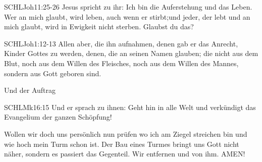 \documentclass[14pt]{../../inc/mybib}
\begin{document}
    \begin{bibelbox}{SCHL}{Joh}{11:25-26}
        Jesus spricht zu ihr: Ich bin die Auferstehung und das Leben. Wer an mich glaubt, wird leben, auch wenn er stirbt;und jeder, der lebt und an mich glaubt, wird in Ewigkeit nicht sterben. Glaubst du das?
    \end{bibelbox} 
    \begin{bibelbox}{SCHL}{Joh}{1:12-13}
        Allen aber, die ihn aufnahmen, denen gab er das Anrecht, Kinder Gottes zu werden, denen, die an seinen Namen glauben;
        die nicht aus dem Blut, noch aus dem Willen des Fleisches, noch aus dem Willen des Mannes, sondern aus Gott geboren sind.
    \end{bibelbox}     
    Und der Auftrag
    \begin{bibelbox}{SCHL}{Mk}{16:15}
        Und er sprach zu ihnen: Geht hin in alle Welt und verkündigt das Evangelium der ganzen Schöpfung!
    \end{bibelbox} 
    Wollen wir doch uns persönlich nun prüfen wo ich am Ziegel streichen bin und wie hoch mein Turm schon ist. Der Bau eines Turmes bringt uns Gott nicht näher, sondern es passiert das Gegenteil. Wir entfernen und von ihm. AMEN!
    
    \beten{}   
    
\end{document}
